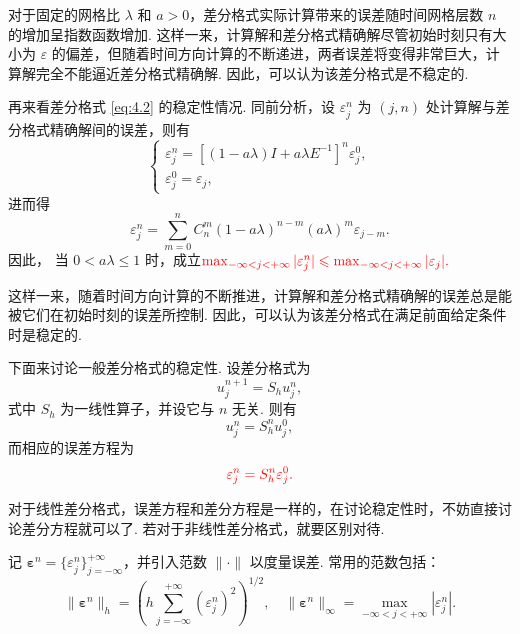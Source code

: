 \begin{conclusion}
    对于固定的网格比 $\lambda$ 和 $a > 0$，差分格式实际计算带来的误差随时间网格层数 $n$ 的增加呈指数函数增加. 这样一来，计算解和差分格式精确解尽管初始时刻只有大小为 $\varepsilon$ 的偏差，但随着时间方向计算的不断递进，两者误差将变得非常巨大，计算解完全不能逼近差分格式精确解. 因此，可以认为该差分格式是不稳定的.
\end{conclusion}

再来看差分格式 \eqref{eq:4.2} 的稳定性情况. 同前分析，设 $\varepsilon_j^n$ 为 $(j,n)$ 处计算解与差分格式精确解间的误差，则有
\begin{equation*}
    \begin{cases}
        \varepsilon_j^n = [(1 - a\lambda)I + a\lambda E^{-1}]^n \varepsilon_j^0, \\
        \varepsilon_j^0 = \varepsilon_j,
    \end{cases}
\end{equation*}
进而得
\[ \varepsilon_j^n = \sum_{m=0}^n C_n^m (1 - a\lambda)^{n-m} (a\lambda)^m \varepsilon_{j-m}. \]
因此，{\color{red} 当 $0 < a\lambda \leq 1$ 时}，成立${\color{red} \max_{-\infty < j < +\infty} |\varepsilon_j^n| \leq \max_{-\infty < j < +\infty} |\varepsilon_j|.}$\par
这样一来，随着时间方向计算的不断推进，计算解和差分格式精确解的误差总是能被它们在初始时刻的误差所控制. 因此，可以认为该差分格式在满足前面给定条件时是稳定的.

下面来讨论一般差分格式的稳定性. 设差分格式为
\begin{equation}
    u_j^{n+1} = S_h u_j^n, \label{eq:4.13}
\end{equation}
式中 $S_h$ 为一线性算子，并设它与 $n$ 无关. 则有
\begin{equation}
    u_j^n = S_h^n u_j^0, \label{eq:4.14}
\end{equation}
而相应的误差方程为
\begin{equation}
    {\color{red} \varepsilon_j^n = S_h^n \varepsilon_j^0.} \label{eq:4.15}
\end{equation}

\begin{remark}
    对于线性差分格式，误差方程和差分方程是一样的，在讨论稳定性时，不妨直接讨论差分方程就可以了. 若对于非线性差分格式，就要区别对待.
\end{remark}

记 $\bm{\varepsilon}^n = \{\varepsilon_j^n\}_{j=-\infty}^{+\infty}$，并引入范数 $\| \cdot \|$ 以度量误差. 常用的范数包括：
\[ \|\bm{\varepsilon}^n\|_h = \left( h \sum_{j=-\infty}^{+\infty} (\varepsilon_j^n)^2 \right)^{1/2}, \quad \|\bm{\varepsilon}^n\|_\infty = \max_{-\infty < j < +\infty} |\varepsilon_j^n|. \]

